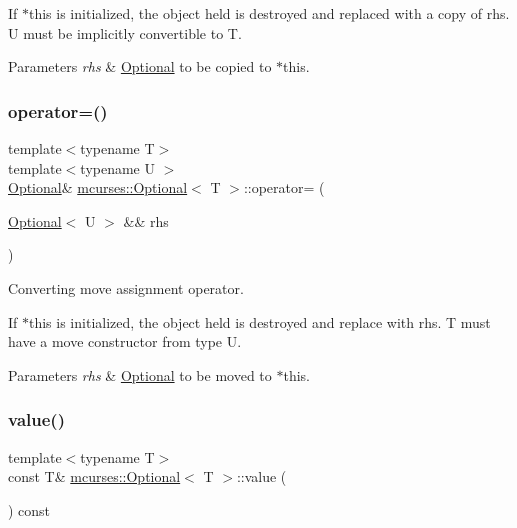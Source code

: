 If $\ast$this is initialized, the object held is destroyed and replaced with a copy of {\ttfamily rhs}. U must be implicitly convertible to T. 
\begin{DoxyParams}{Parameters}
{\em rhs} & \hyperlink{classmcurses_1_1Optional}{Optional} to be copied to $\ast$this. \\
\hline
\end{DoxyParams}
\hypertarget{classmcurses_1_1Optional_a08e3433ed663644a0f6f7148197df952}{}\label{classmcurses_1_1Optional_a08e3433ed663644a0f6f7148197df952} 
\subsubsection{\texorpdfstring{operator=()}{operator=()}\hspace{0.1cm}{\footnotesize\ttfamily [7/7]}}
{\footnotesize\ttfamily template$<$typename T$>$ \\
template$<$typename U $>$ \\
\hyperlink{classmcurses_1_1Optional}{Optional}\& \hyperlink{classmcurses_1_1Optional}{mcurses\+::\+Optional}$<$ T $>$\+::operator= (\begin{DoxyParamCaption}\item[{\hyperlink{classmcurses_1_1Optional}{Optional}$<$ U $>$ \&\&}]{rhs }\end{DoxyParamCaption})\hspace{0.3cm}{\ttfamily [inline]}}



Converting move assignment operator. 

If $\ast$this is initialized, the object held is destroyed and replace with {\ttfamily rhs}. T must have a move constructor from type U. 
\begin{DoxyParams}{Parameters}
{\em rhs} & \hyperlink{classmcurses_1_1Optional}{Optional} to be moved to $\ast$this. \\
\hline
\end{DoxyParams}
\hypertarget{classmcurses_1_1Optional_ad366988d0311c9f6d4de369f222f248f}{}\label{classmcurses_1_1Optional_ad366988d0311c9f6d4de369f222f248f} 
\subsubsection{\texorpdfstring{value()}{value()}\hspace{0.1cm}{\footnotesize\ttfamily [1/3]}}
{\footnotesize\ttfamily template$<$typename T$>$ \\
const T\& \hyperlink{classmcurses_1_1Optional}{mcurses\+::\+Optional}$<$ T $>$\+::value (\begin{DoxyParamCaption}{ }\end{DoxyParamCaption}) const\hspace{0.3cm}{\ttfamily [inline]}}



